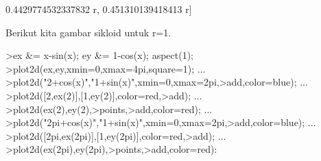 \documentclass{article}
\begin{document}
\begin{eulernotebook}
\begin{eulercomment}
\begin{eulercomment}
\begin{eulercomment}
\begin{eulercomment}
\begin{eulercomment}
\begin{eulercomment}
\begin{eulercomment}
\begin{eulercomment}
\begin{eulercomment}
\begin{eulercomment}
\begin{eulercomment}
\begin{eulercomment}
\begin{eulercomment}
\begin{eulercomment}
\begin{eulercomment}
\begin{eulercomment}
\begin{eulercomment}
\begin{eulercomment}
\begin{euleroutput}
  0.4429774532337832 r, 0.451310139418413 r]
  
\end{euleroutput}
\begin{eulercomment}
Berikut kita gambar sikloid untuk r=1.
\end{eulercomment}
\begin{eulerprompt}
>ex &= x-sin(x); ey &= 1-cos(x); aspect(1);
>plot2d(ex,ey,xmin=0,xmax=4pi,square=1); ...
>plot2d("2+cos(x)","1+sin(x)",xmin=0,xmax=2pi,>add,color=blue); ...
>plot2d([2,ex(2)],[1,ey(2)],color=red,>add); ...
>plot2d(ex(2),ey(2),>points,>add,color=red); ...
>plot2d("2pi+cos(x)","1+sin(x)",xmin=0,xmax=2pi,>add,color=blue); ...
>plot2d([2pi,ex(2pi)],[1,ey(2pi)],color=red,>add); ...
>plot2d(ex(2pi),ey(2pi),>points,>add,color=red):
\end{eulerprompt}
\begin{euleroutput}

\end{euleroutput}
\end{eulercomment}
\end{eulercomment}
\end{eulercomment}
\end{eulercomment}
\end{eulercomment}
\end{eulercomment}
\end{eulercomment}
\end{eulercomment}
\end{eulercomment}
\end{eulercomment}
\end{eulercomment}
\end{eulercomment}
\end{eulercomment}
\end{eulercomment}
\end{eulercomment}
\end{eulercomment}
\end{eulercomment}
\end{eulercomment}
\end{eulernotebook}
\end{document}
